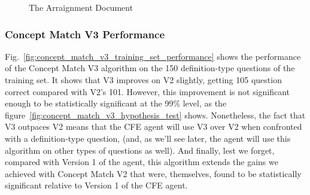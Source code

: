 \begin{figure}
\centering
\vspace{0.75in}
\caption{The Arraignment Document}
\label{fig:concept_match_v3_example_document}
\end{figure}


\subsubsection{Concept Match V3 Performance}

Fig.~\ref{fig:concept_match_v3_training_set_performance} shows the performance of the Concept Match V3 algorithm on the 150 definition-type questions of the training set.  It shows that V3 improves on V2 slightly, getting 105 question correct compared with V2's 101.  However, this improvement is not significant enough to be statistically significant at the 99\% level, as the figure~\ref{fig:concept_match_v3_hypothesis_test} shows.  Nonetheless, the fact that V3 outpaces V2 means that the CFE agent will use V3 over V2 when confronted with a definition-type question, (and, as we'll see later, the agent will use this algorithm on other types of questions as well).  And finally, lest we forget, compared with Version 1 of the agent, this algorithm extends the gains we achieved with Concept Match V2 that were, themselves, found to be statistically significant relative to Version 1 of the CFE agent.

